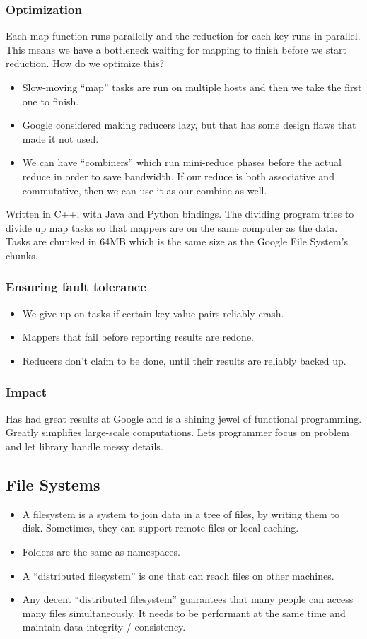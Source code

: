\documentclass{scrartcl}
\begin{document}
\subsubsection*{Optimization}
Each map function runs parallelly and the reduction for each key runs in parallel.
This means we have a bottleneck waiting for mapping to finish before we start
reduction. How do we optimize this?
\begin{itemize}
\item Slow-moving ``map'' tasks are run on multiple hosts and then we take the
	first one to finish.
\item Google considered making reducers lazy, but that has some design flaws
	that made it not used.
\item We can have ``combiners'' which run mini-reduce phases before the actual
	reduce in order to save bandwidth. If our reduce is both associative and
	commutative, then we can use it as our combine as well.
\end{itemize}

Written in C++, with Java and Python bindings. The dividing program tries
to divide up map tasks so that mappers are on the same computer as the data.
Tasks are chunked in 64MB which is the same size as the Google File System's
chunks.

\subsubsection*{Ensuring fault tolerance}
\begin{itemize}
\item We give up on tasks if certain key-value pairs reliably crash.
\item Mappers that fail before reporting results are redone.
\item Reducers don't claim to be done, until their results are reliably backed
	up.
\end{itemize}
\subsubsection*{Impact}
Has had great results at Google and is a shining jewel of functional programming.
Greatly simplifies large-scale computations. Lets programmer focus on problem
and let library handle messy details.

\subsection*{File Systems}
\begin{itemize}
\item A filesystem is a system to join data in a tree of files, by writing
	them to disk. Sometimes, they can support remote files or local caching.
\item Folders are the same as namespaces.
\item A ``distributed filesystem'' is one that can reach files on other machines.
\item Any decent ``distributed filesystem'' guarantees that many people can
	access many files simultaneously. It needs to be performant at the same
	time and maintain data integrity / consistency.
\end{itemize}
\end{document}
